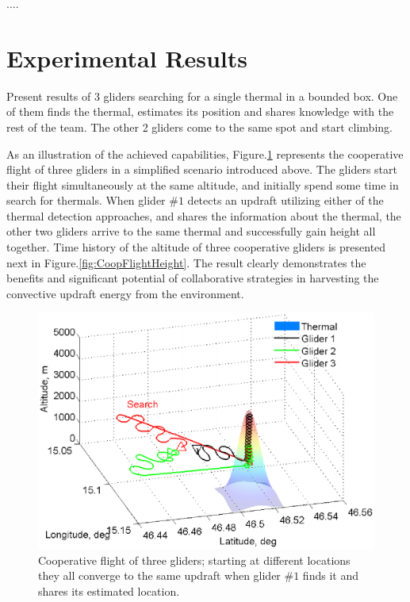\documentclass[letterpaper, 10 pt, conference]{ieeeconf}  %
\begin{document}
....

\section{Experimental Results}

Present results of 3 gliders searching for a single thermal in a bounded box. 
One of them finds the thermal, estimates its position and shares knowledge 
with the rest of the team. The other 2 gliders come to the same spot and 
start climbing.

As an illustration of the achieved capabilities, 
Figure.\ref{fig:CoopFlightPaths} represents the cooperative flight of three 
gliders in a simplified scenario introduced above. The gliders start their 
flight simultaneously at the same altitude, and initially spend some time in 
search for thermals. When glider $\#1$ detects an updraft utilizing either of 
the thermal detection approaches, and shares the information about the 
thermal, the other two gliders arrive to the same thermal and successfully 
gain height all together. Time history of the altitude of three cooperative 
gliders is presented next in Figure.\ref{fig:CoopFlightHeight}. The result 
clearly demonstrates the benefits and significant potential of collaborative 
strategies in harvesting the convective updraft energy from the environment.
\begin{figure}[thpb]
  \centering
  \includegraphics[scale=0.41]{Figures/paths_cooperative_flight.eps}
  \caption{Cooperative flight of three gliders; starting at different locations
  they all converge to the same updraft when glider $\#1$ finds it and
  shares its estimated location.}
  \label{fig:CoopFlightPaths}
\end{figure}
\end{document}
